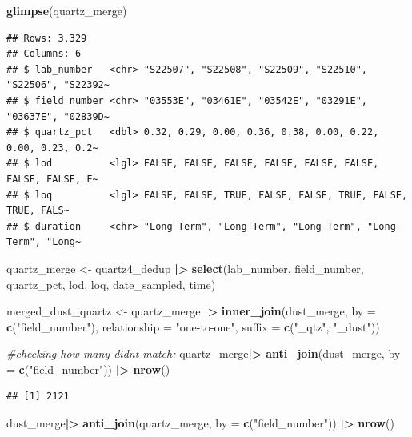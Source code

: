 \documentclass[
]{article}
\newenvironment{Shaded}{\begin{snugshade}}{\end{snugshade}}
\newcommand{\AttributeTok}[1]{\textcolor[rgb]{0.13,0.29,0.53}{#1}}
\newcommand{\CommentTok}[1]{\textcolor[rgb]{0.56,0.35,0.01}{\textit{#1}}}
\newcommand{\FunctionTok}[1]{\textcolor[rgb]{0.13,0.29,0.53}{\textbf{#1}}}
\newcommand{\NormalTok}[1]{#1}
\newcommand{\OtherTok}[1]{\textcolor[rgb]{0.56,0.35,0.01}{#1}}
\newcommand{\SpecialCharTok}[1]{\textcolor[rgb]{0.81,0.36,0.00}{\textbf{#1}}}
\newcommand{\StringTok}[1]{\textcolor[rgb]{0.31,0.60,0.02}{#1}}
\begin{document}
\begin{Shaded}
\begin{Highlighting}[]
\FunctionTok{glimpse}\NormalTok{(quartz\_merge) }
\end{Highlighting}
\end{Shaded}

\begin{verbatim}
## Rows: 3,329
## Columns: 6
## $ lab_number   <chr> "S22507", "S22508", "S22509", "S22510", "S22506", "S22392~
## $ field_number <chr> "03553E", "03461E", "03542E", "03291E", "03637E", "02839D~
## $ quartz_pct   <dbl> 0.32, 0.29, 0.00, 0.36, 0.38, 0.00, 0.22, 0.00, 0.23, 0.2~
## $ lod          <lgl> FALSE, FALSE, FALSE, FALSE, FALSE, FALSE, FALSE, FALSE, F~
## $ loq          <lgl> FALSE, FALSE, TRUE, FALSE, FALSE, TRUE, FALSE, TRUE, FALS~
## $ duration     <chr> "Long-Term", "Long-Term", "Long-Term", "Long-Term", "Long~
\end{verbatim}

\begin{Shaded}
\begin{Highlighting}[]
\NormalTok{quartz\_merge }\OtherTok{\textless{}{-}}\NormalTok{ quartz4\_dedup }\SpecialCharTok{|\textgreater{}} 
  \FunctionTok{select}\NormalTok{(lab\_number, field\_number, quartz\_pct, lod, loq, date\_sampled, time)}


\NormalTok{merged\_dust\_quartz }\OtherTok{\textless{}{-}}\NormalTok{ quartz\_merge }\SpecialCharTok{|\textgreater{}} 
  \FunctionTok{inner\_join}\NormalTok{(dust\_merge, }\AttributeTok{by =} \FunctionTok{c}\NormalTok{(}\StringTok{"field\_number"}\NormalTok{),}
             \AttributeTok{relationship =} \StringTok{"one{-}to{-}one"}\NormalTok{,}
             \AttributeTok{suffix =} \FunctionTok{c}\NormalTok{(}\StringTok{"\_qtz"}\NormalTok{, }\StringTok{"\_dust"}\NormalTok{))}


\CommentTok{\#checking how many didn\textquotesingle{}t match: }
\NormalTok{quartz\_merge}\SpecialCharTok{|\textgreater{}} 
  \FunctionTok{anti\_join}\NormalTok{(dust\_merge, }\AttributeTok{by =} \FunctionTok{c}\NormalTok{(}\StringTok{"field\_number"}\NormalTok{)) }\SpecialCharTok{|\textgreater{}} 
  \FunctionTok{nrow}\NormalTok{()}
\end{Highlighting}
\end{Shaded}

\begin{verbatim}
## [1] 2121
\end{verbatim}

\begin{Shaded}
\begin{Highlighting}[]
\NormalTok{dust\_merge}\SpecialCharTok{|\textgreater{}} 
  \FunctionTok{anti\_join}\NormalTok{(quartz\_merge, }\AttributeTok{by =} \FunctionTok{c}\NormalTok{(}\StringTok{"field\_number"}\NormalTok{)) }\SpecialCharTok{|\textgreater{}} 
  \FunctionTok{nrow}\NormalTok{()}
\end{Highlighting}
\end{Shaded}
\end{document}
